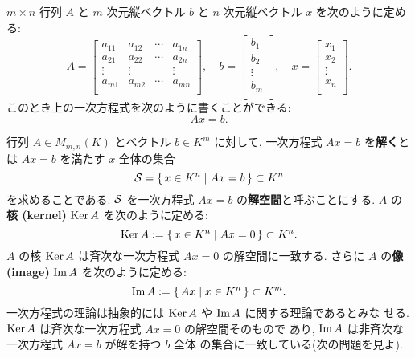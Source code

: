 \documentclass[12pt,twoside]{jarticle}
\begin{document}
$m\times n$ 行列 $A$ と $m$ 次元縦ベクトル $b$ と %
$n$ 次元縦ベクトル $x$ を次のように定める:
\begin{equation*}
  A = 
  \begin{bmatrix}
    a_{11} & a_{12} & \cdots & a_{1n} \\
    a_{21} & a_{22} & \cdots & a_{2n} \\
    \vdots & \vdots &        & \vdots \\
    a_{m1} & a_{m2} & \cdots & a_{mn} \\
  \end{bmatrix},
  \quad
  b =
  \begin{bmatrix}
    b_1 \\
    b_2 \\
    \vdots \\
    b_m \\
  \end{bmatrix},
  \quad
  x =
  \begin{bmatrix}
    x_1 \\
    x_2 \\
    \vdots \\
    x_n \\
  \end{bmatrix}.
\end{equation*}
このとき上の一次方程式を次のように書くことができる:
\begin{equation*}
  Ax = b.
\end{equation*}

行列 $A\in M_{m,n}(K)$ とベクトル $b\in K^m$ に対して, 
一次方程式 $Ax=b$ を{\bf 解く}とは $Ax=b$ を満たす $x$ 全体の集合
\begin{equation*}
  {\mathcal S} = \{\, x \in K^n \mid Ax = b \,\} \subset K^n
\end{equation*}
を求めることである. ${\mathcal S}$ を一次方程式 $Ax=b$ の{\bf 解空間}と呼ぶことにする.
$A$ の{\bf 核 (kernel)} $\mathop{\mathrm{Ker}}\nolimits A$ を次のように定める:
\begin{equation*}
  \mathop{\mathrm{Ker}}\nolimits A := \{\, x \in K^n \mid Ax = 0 \,\} \subset K^n.
\end{equation*}
$A$ の核 $\mathop{\mathrm{Ker}}\nolimits A$ は斉次な一次方程式 $Ax=0$ の解空間に一致する.
さらに $A$ の{\bf 像 (image)} $\mathop{\mathrm{Im}}\nolimits A$ を次のように定める:
\begin{equation*}
  \mathop{\mathrm{Im}}\nolimits A := \{\, Ax \mid x \in K^n \,\} \subset K^m.
\end{equation*}
一次方程式の理論は抽象的には $\mathop{\mathrm{Ker}}\nolimits A$ や $\mathop{\mathrm{Im}}\nolimits A$ に関する理論であるとみな
せる. $\mathop{\mathrm{Ker}}\nolimits A$ は斉次な一次方程式 $Ax=0$ の解空間そのもので
あり, $\mathop{\mathrm{Im}}\nolimits A$ は非斉次な一次方程式 $Ax=b$ が解を持つ $b$ 全体
の集合に一致している(次の問題を見よ).
\end{document}
